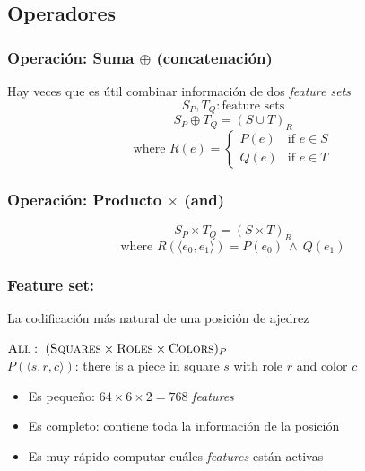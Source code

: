 \subsection{Operadores}

\begin{frame}
\frametitle{Operación: Suma $\oplus$ (concatenación)}
Hay veces que es útil combinar información de dos \textit{feature sets} \\
\pause
\begin{equation*}
S_P, T_Q: \text{feature sets}
\end{equation*}
\begin{equation*}
S_P \oplus T_Q = {(S \cup T)}_R
\end{equation*}
\begin{equation*}
    \text{where } R(e) = \begin{cases}
        P(e) & \text{if } e \in S \\
        Q(e) & \text{if } e \in T
    \end{cases}
\end{equation*}
\end{frame}

\begin{frame}
\frametitle{Operación: Producto $\times$ (and)}
\begin{equation*}
S_P \times T_Q = {(S \times T)}_{R}
\end{equation*}
\begin{equation*}
\text{where } R(\langle e_0, e_1 \rangle) = P(e_0)\ \land\ Q(e_1)
\end{equation*}
\end{frame}

\begin{frame}
\frametitle{Feature set: }
La codificación más natural de una posición de ajedrez \\
\begin{center}
    $\textsc{All}:\ (\textsc{Squares} \times \textsc{Roles} \times \textsc{Colors})_{P}$ \\
    $P(\langle s, r, c \rangle)$: there is a piece in square $s$ with role $r$ and color $c$\\
\end{center}
\pause
\begin{itemize}
    \item<2-> Es pequeño: $64 \times 6 \times 2 = 768$ \textit{features}
    \item<3-> Es completo: contiene toda la información de la posición
    \item<4-> Es muy rápido computar cuáles \textit{features} están activas
\end{itemize}
\end{frame}

